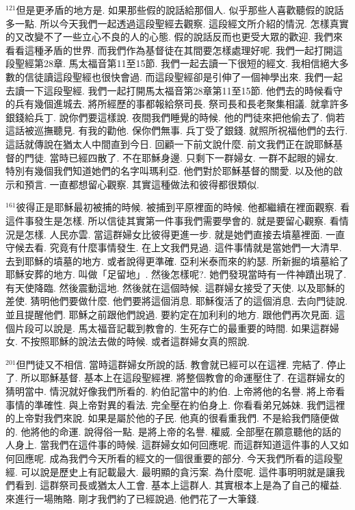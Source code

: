 \documentclass{book}
\begin{document}
$^{121}$但是更矛盾的地方是.
如果那些假的說話給那個人.
似乎那些人喜歡聽假的說話多一點.
所以今天我們一起透過這段聖經去觀察.
這段經文所介紹的情況.
怎樣真實的又改變不了一些立心不良的人的心態.
假的說話反而也更受大眾的歡迎.
我們來看看這種矛盾的世界.
而我們作為基督徒在其間要怎樣處理好呢.
我們一起打開這段聖經第28章.
馬太福音第11至15節.
我們一起去讀一下很短的經文.
我相信絕大多數的信徒讀這段聖經也很快會過.
而這段聖經卻是引伸了一個神學出來.
我們一起去讀一下這段聖經.
我們一起打開馬太福音第28章第11至15節.
他們去的時候看守的兵有幾個進城去.
將所經歷的事都報給祭司長.
祭司長和長老聚集相議.
就拿許多銀錢給兵丁.
說你們要這樣說.
夜間我們睡覺的時候.
他的門徒來把他偷去了.
倘若這話被巡撫聽見.
有我的勸他.
保你們無事.
兵丁受了銀錢.
就照所祝福他們的去行.
這話就傳說在猶太人中間直到今日.
回顧一下前文說什麼.
前文我們正在說耶穌基督的門徒.
當時已經四散了.
不在耶穌身邊.
只剩下一群婦女.
一群不起眼的婦女.
特別有幾個我們知道她們的名字叫瑪利亞.
他們對於耶穌基督的關愛.
以及他的啟示和預言.
一直都想留心觀察.
其實這種做法和彼得都很類似.

$^{161}$彼得正是耶穌最初被捕的時候.
被捕到平原裡面的時候.
他都繼續在裡面觀察.
看這件事發生是怎樣.
所以信徒其實第一件事我們需要學會的.
就是要留心觀察.
看情況是怎樣.
人民亦雲.
當這群婦女比彼得更進一步.
就是她們直接去墳墓裡面.
一直守候去看.
究竟有什麼事情發生.
在上文我們見過.
這件事情就是當她們一大清早.
去到耶穌的墳墓的地方.
或者說得更準確.
亞利米泰而來的約瑟.
所新掘的墳墓給了耶穌安葬的地方.
叫做「足留地」.
然後怎樣呢?.
她們發現當時有一件神蹟出現了.
有天使降臨.
然後震動這地.
然後就在這個時候.
這群婦女接受了天使.
以及耶穌的差使.
猜明他們要做什麼.
他們要將這個消息.
耶穌復活了的這個消息.
去向門徒說.
並且提醒他們.
耶穌之前跟他們說過.
要約定在加利利的地方.
跟他們再次見面.
這個片段可以說是.
馬太福音記載到教會的.
生死存亡的最重要的時間.
如果這群婦女.
不按照耶穌的說法去做的時候.
或者這群婦女真的照說.

$^{201}$但門徒又不相信.
當時這群婦女所說的話.
教會就已經可以在這裡.
完結了.
停止了.
所以耶穌基督.
基本上在這段聖經裡.
將整個教會的命運壓住了.
在這群婦女的猜明當中.
情況就好像我們所看的.
約伯記當中的約伯.
上帝將他的名譽.
將上帝看事情的準確性.
與上帝對異的看法.
完全壓在約伯身上.
你看看弟兄姊妹.
我們這裡的上帝對我們來說.
如果是屬於他的子民.
他真的很看重我們.
不是給我們隨便做的.
他將他的命運.
說得俗一點.
是將上帝的名譽.
權威.
全部壓在願意聽他的話的人身上.
當我們在這件事的時候.
這群婦女如何回應呢.
而這群知道這件事的人又如何回應呢.
成為我們今天所看的經文的一個很重要的部分.
今天我們所看的這段聖經.
可以說是歷史上有記載最大.
最明顯的貪污案.
為什麼呢.
這件事明明就是讓我們看到.
這群祭司長或猶太人工會.
基本上這群人.
其實根本上是為了自己的權益.
來進行一場賄賂.
剛才我們約了已經說過.
他們花了一大筆錢.
\end{document}
